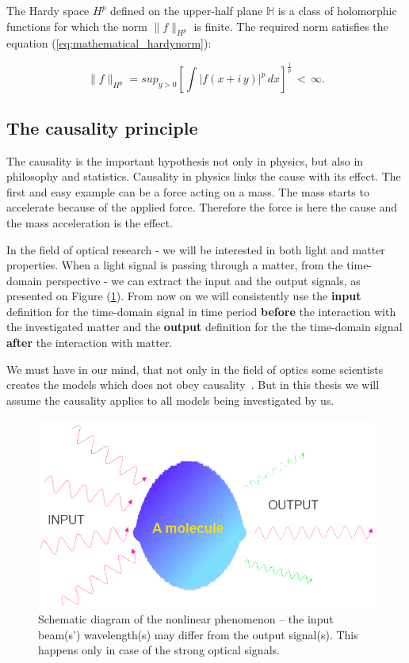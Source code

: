 \documentclass[12pt,twoside,a4paper]{article}
\numberwithin{equation}{subsection}
\numberwithin{figure}{subsection}
\begin{document}
The Hardy space $ H^{p} $ defined on the upper-half plane $ \mathbb{H} $ is a class of holomorphic functions for which the norm $
\|f\|_{H^p} $ is finite. The required norm satisfies the equation (\ref{eq:mathematical_hardynorm}):

\begin{equation} \label{eq:mathematical_hardynorm}
  \|f\|_{H^p} = sup_{ y > 0 } \left[ \int |f(x + i \, y)|^{p} \, dx \right]^{\frac{1}{p}} \, < \, \infty.
\end{equation}

\subsection{The causality principle} \label{chap:mathematical_causality}

The causality is the important hypothesis not only in physics, but also in philosophy and statistics. Causality in physics links the cause
with its effect. The first and easy example can be a force acting on a mass. The mass starts to accelerate because of the applied force.
Therefore the force is here the cause and the mass acceleration is the effect.

In the field of optical research - we will be interested in both light and matter properties. When a light signal is passing through a
matter, from the time-domain perspective - we can extract the input and the output signals, as presented on Figure
(\ref{fig:mathematical_inoutput}). From now on we will consistently use the \textbf{input} definition for the time-domain signal in time
period \textbf{before} the interaction with the investigated matter and the \textbf{output} definition for the the time-domain signal
\textbf{after} the interaction with matter.

 We must have in our mind, that not only in the field of optics some scientists creates the models which does not obey
 causality~\cite{mukamel_causal}. But in this thesis we will assume the causality applies to all models being investigated by us.

\begin{figure} 
  \includegraphics[width=150mm]{img/opt_phenom3.png}
  \caption{Schematic diagram of the nonlinear phenomenon -- the input beam(s') wavelength(s) may differ from the output signal(s).
  This happens only in case of the strong optical signals.
  \label{fig:mathematical_inoutput}}
\end{figure}
\end{document}
